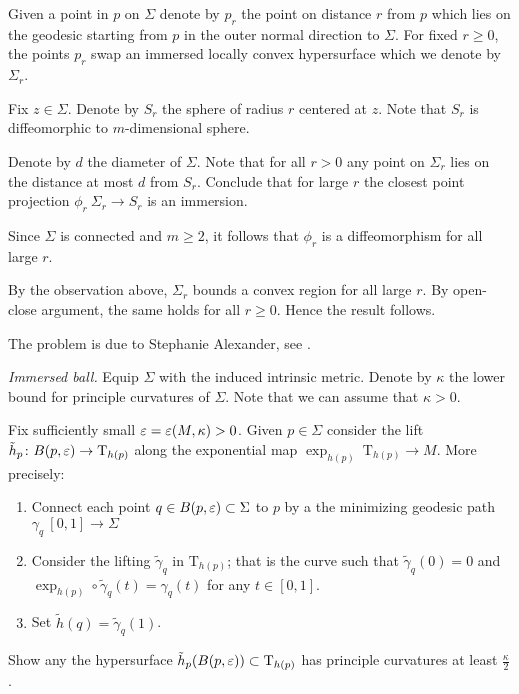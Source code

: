 Given a point in $p$ on $\Sigma$ 
denote by $p_r$ the point on distance $r$ from $p$
which lies on the geodesic starting from $p$ in the outer normal direction to $\Sigma$.
For fixed $r\ge 0$,
the points $p_r$ swap an immersed locally convex hypersurface which we denote by $\Sigma_r$.

Fix $z\in \Sigma$.
Denote by $S_r$ the sphere of radius $r$ centered at $z$.
Note that $S_r$ is diffeomorphic to $m$-dimensional sphere.

Denote by $d$ the diameter of $\Sigma$.
Note that for all $r>0$
any point on $\Sigma_r$
lies on the distance at most $d$ from $S_r$.
Conclude that for large $r$ the closest point projection $\phi_r\:\Sigma_r\to S_r$ is an immersion.


Since $\Sigma$ is connected
and $m\ge 2$, it follows that $\phi_r$ is a diffeomorphism for all large $r$.

By the observation above, $\Sigma_r$ bounds a convex region for all large $r$.
By open-close argument, the same holds for all $r\ge 0$.
Hence the result follows.

The problem is due to Stephanie Alexander, see \cite{alexander}.



\textit{Immersed ball.}
Equip $\Sigma$ with the induced intrinsic metric.
Denote by $\kappa$ the lower bound for principle curvatures of $\Sigma$.
Note that we can assume that $\kappa>0$.

Fix sufficiently small $\varepsilon=\varepsilon(M,\kappa)>0$.
Given $p\in \Sigma$ consider the lift $\tilde h_p\colon B(p,\varepsilon)\to \mathrm{T}_{h(p)}$ along the exponential map $\exp_{h(p)}\:\mathrm{T}_{h(p)}\to M$.
More precisely:
\begin{enumerate}
\item Connect each point $q\in B(p,\varepsilon)\subset \Sigma$ to $p$
by a the minimizing geodesic  path $\gamma_q\:[0,1]\to \Sigma$
\item Consider the lifting $\tilde\gamma_q$ in $\mathrm{T}_{h(p)}$; 
that is the curve such that $\tilde\gamma_q(0)=0$ and $\exp_{h(p)}\circ\tilde\gamma_q(t)=\gamma_q(t)$ for any $t\in[0,1]$.
 \item Set $\tilde h(q)=\tilde\gamma_q(1)$.
\end{enumerate}

Show any the hypersurface $\tilde h_p(B(p,\varepsilon))\subset \mathrm{T}_{h(p)}$ has principle curvatures at least $\tfrac\kappa2$.

